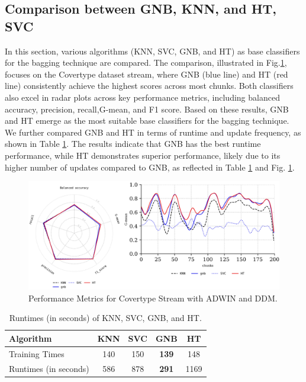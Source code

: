 \subsection{Comparison between GNB, KNN, and HT, SVC}
\label{sec:compared_base_calssfier}
In this section, various algorithms (KNN, SVC, GNB, and HT) as base classifiers for the bagging technique are compared. The comparison, illustrated in Fig.\ref{fig:res4}, focuses on the Covertype dataset stream, where GNB (blue line) and HT (red line) consistently achieve the highest scores across most chunks. Both classifiers also excel in radar plots across key performance metrics, including balanced accuracy, precision, recall,G-mean, and F1 score. Based on these results, GNB and HT emerge as the most suitable base classifiers for the bagging technique. We further compared GNB and HT in terms of runtime and update frequency, as shown in Table \ref{table:table_3}. The results indicate that GNB has the best runtime performance, while HT demonstrates superior performance, likely due to its higher number of updates compared to GNB, as reflected in Table \ref{table:table_3} and Fig. \ref{fig:res4}.

\begin{figure}[t]
	\centering
	\includegraphics[width=1\linewidth]{5_Emerging/images/res4.png}
	\caption{Performance Metrics for Covertype Stream with ADWIN and DDM.}

	\label{fig:res4}
\end{figure}				

	
\begin{table}[t]
	\centering
	\caption{Runtimes (in seconds) of KNN, SVC, GNB, and HT.}
	\begin{tabular}{|l|c|c|c|c|}
	\hline
	\textbf{Algorithm}     & \textbf{KNN} & \textbf{SVC} & \textbf{GNB} & \textbf{HT} \\ \hline
		Training Times         & 140          & 150          & \textbf{139} & 148         \\ \hline
		Runtimes (in seconds)         & 586          & 878          & \textbf{291} & 1169        \\ \hline
	\end{tabular}
	\label{table:table_3}
	\end{table}


